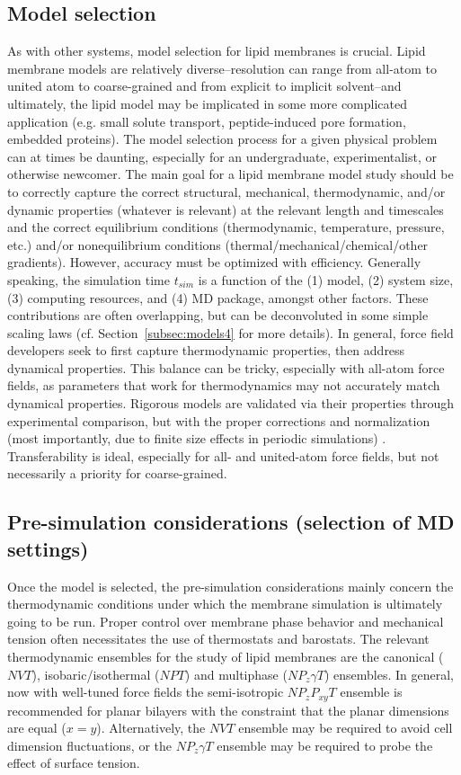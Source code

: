 \documentclass[9pt,bestpractices]{livecoms}
\begin{document}
\subsection{Model selection}
\label{subsec:models3}
As with other systems, model selection for lipid membranes is crucial.
Lipid membrane models are relatively diverse--resolution can range from all-atom to united atom to coarse-grained and from explicit to implicit solvent--and ultimately, the lipid model may be implicated in some more complicated application (e.g. small solute transport, peptide-induced pore formation, embedded proteins).
The model selection process for a given physical problem can at times be daunting, especially for an undergraduate, experimentalist, or otherwise newcomer.
The main goal for a lipid membrane model study should be to correctly capture the correct structural, mechanical, thermodynamic, and/or dynamic properties (whatever is relevant) at the relevant length and timescales and the correct equilibrium conditions (thermodynamic, temperature, pressure, etc.) and/or nonequilibrium conditions (thermal/mechanical/chemical/other gradients).
However, accuracy must be optimized with efficiency.
Generally speaking, the simulation time $t_{sim}$ is a function of the (1) model, (2) system size, (3) computing resources, and (4) MD package, amongst other factors.
These contributions are often overlapping, but can be deconvoluted in some simple scaling laws (cf. Section~\ref{subsec:models4} for more details).
In general, force field developers seek to first capture thermodynamic properties, then address dynamical properties.
This balance can be tricky, especially with all-atom force fields, as parameters that work for thermodynamics may not accurately match dynamical properties.
Rigorous models are validated via their properties through experimental comparison, but with the proper corrections and normalization (most importantly, due to finite size effects in periodic simulations) \cite{Venable2017,Klauda2006b}.
Transferability is ideal, especially for all- and united-atom force fields, but not necessarily a priority for coarse-grained.

\subsection{Pre-simulation considerations (selection of MD settings)}
\label{subsec:presim3}
Once the model is selected, the pre-simulation considerations mainly concern the thermodynamic conditions under which the membrane simulation is ultimately going to be run.
Proper control over membrane phase behavior and mechanical tension often necessitates the use of thermostats and barostats.
The relevant thermodynamic ensembles for the study of lipid membranes are the canonical ($NVT$), isobaric/isothermal ($NPT$) and multiphase ($NP_z \gamma T$) ensembles.
In general, now with well-tuned force fields the semi-isotropic $NP_{z}P_{xy}T$ ensemble is recommended for planar bilayers with the constraint that the planar dimensions are equal ($x=y$).
Alternatively, the $NVT$ ensemble may be required to avoid cell dimension fluctuations, or the $NP_z \gamma T$ ensemble may be required to probe the effect of surface tension.
\end{document}

